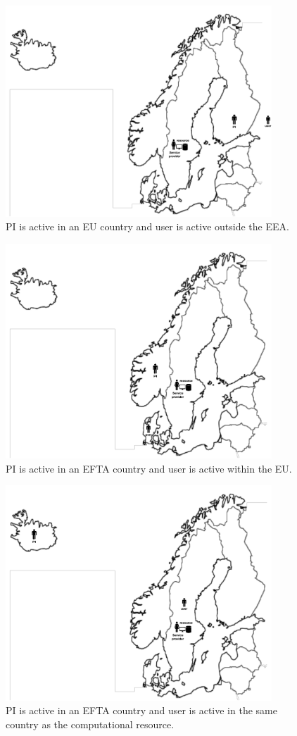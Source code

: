 \documentclass{article}
\begin{document}
\begin{figure}[!ht]
\centering
\includegraphics[width=10cm]{PI_EU_User_Non_EU.pdf}
\caption{PI is active in an EU country and user is active outside the EEA.}\label{fig:eu_non}
\end{figure}

\begin{figure}[!ht]
\centering
\includegraphics[width=10cm]{PI_EAA_User_EU.pdf}
\caption{PI is active in an EFTA country and user is active within the EU.}\label{fig:eaa_eu}
\end{figure}

\begin{figure}[!ht]
\centering
\includegraphics[width=10cm]{PI_EAA_User_National.pdf}
\caption{PI is active in an EFTA country and user is active in the same country as the computational resource.}\label{fig:eaa_nat}
\end{figure}
\end{document}

